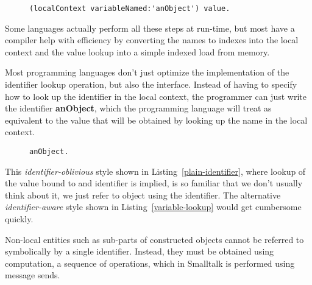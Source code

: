 \documentclass[preprint,authoryear]{acm_proc_article-sp}
\begin{document}
\begin{figure}[htbp]
\begin{lstlisting}[style=L,label=variable-lookup,caption=Lookup of a local variable.]
  (localContext variableNamed:'anObject') value.
\end{lstlisting}
\end{figure}

Some  languages actually perform all these steps at run-time, but most 
have a compiler help with efficiency by converting the names to indexes into
the local context and the value lookup into a simple indexed load from memory.

Most programming languages don't just optimize the implementation of the identifier
lookup operation, but also the interface.  Instead of having to specify how to
look up the identifier in the local context, the programmer can just write the
identifier {\bf anObject}, which the programming language will treat as equivalent to the
value that will be obtained by looking up the name in the local context.  


\begin{figure}[htbp]
\begin{lstlisting}[style=L,label=plain-identifier,caption=Identifier-oblivious variable lookup.]
  anObject.
\end{lstlisting}
\end{figure}

This  {\em identifier-oblivious} style shown in Listing~\ref{plain-identifier}, where lookup of the value bound to and
identifier is implied, is so familiar that we don't usually think about it, we just
refer to object using the identifier.
The alternative {\em identifier-aware} style shown in Listing~\ref{variable-lookup} would get cumbersome quickly.

Non-local entities such as sub-parts of constructed objects 
cannot be referred to symbolically by a single identifier.
Instead, they must be obtained using computation, a 
sequence of operations, which in Smalltalk is performed using message sends.
\end{document}
